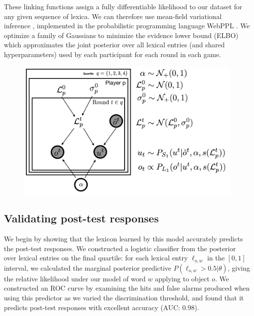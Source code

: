 \documentclass[10pt,letterpaper]{article}
\begin{document}
These linking functions assign a fully differentiable likelihood to our dataset for any given sequence of lexica. We can therefore use mean-field variational inference \cite{RanganathGerrishBlei13_BlackBoxVariationalInference}, implemented in the probabilistic programming language WebPPL \cite{GoodmanStuhlmuller14_DIPPL}. We optimize a family of Gaussians to minimize the evidence lower bound (ELBO) which approximates the joint posterior over all lexical entries (and shared hyperparameters) used by each participant for each round in each game. 

\begin{figure}[t]
\begin{center}
{\includegraphics[scale=.4]{modelSchematic}}
{\caption{{\footnotesize {}    \label{fig:modelSchematic}}}}
\end{center}
\end{figure}

\subsection{Validating post-test responses}

We begin by showing that the lexicon learned by this model accurately predicts the post-test responses. We constructed a logistic classifier from the posterior over lexical entries on the final quartile: for each lexical entry $\ell_{o,w}$ in the $[0,1]$ interval, we calculated the marginal posterior predictive $P(\ell_{o,w} > 0.5 | \theta)$, giving the relative likelihood under our model of word $w$ applying to object $o$. We constructed an ROC curve by examining the hits and false alarms produced when using this predictor as we varied the discrimination threshold, and found that it predicts post-test responses with excellent accuracy (AUC: 0.98). 
\end{document}

